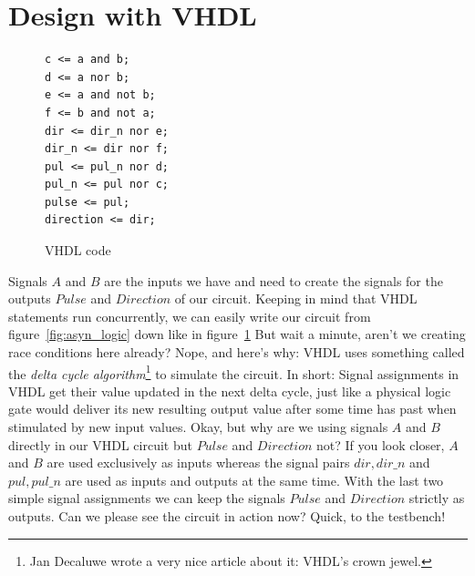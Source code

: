 \documentclass[a4paper]{article}
\begin{document}
\section{Design with VHDL}
\begin{figure}
\centering
\begin{BVerbatim}
c <= a and b;
d <= a nor b;
e <= a and not b;
f <= b and not a;
dir <= dir_n nor e;
dir_n <= dir nor f;
pul <= pul_n nor d;
pul_n <= pul nor c;
pulse <= pul;
direction <= dir;
\end{BVerbatim}
\caption{VHDL code}
\label{fig:asyn_vhdl}
\end{figure}
Signals $A$ and $B$ are the inputs we have and need to create the signals for the outputs $Pulse$ and $Direction$ of our circuit.
Keeping in mind that VHDL statements run concurrently, we can easily write our circuit from figure~\ref{fig:asyn_logic} down like in figure~\ref{fig:asyn_vhdl}
But wait a minute, aren't we creating race conditions here already?
Nope, and here's why: VHDL uses something called the \emph{delta cycle algorithm}\footnote{Jan Decaluwe wrote a very nice article about it: VHDL's crown jewel.} to simulate the circuit.
In short: Signal assignments in VHDL get their value updated in the next delta cycle, just like a physical logic gate would deliver its new resulting output value after some time has past when stimulated by new input values.
Okay, but why are we using signals $A$ and $B$ directly in our VHDL circuit but $Pulse$ and $Direction$ not?
If you look closer, $A$ and $B$ are used exclusively as inputs whereas the signal pairs $dir,dir\_n$ and $pul,pul\_n$ are used as inputs and outputs at the same time.
With the last two simple signal assignments we can keep the signals $Pulse$ and $Direction$ strictly as outputs.
Can we please see the circuit in action now? Quick, to the testbench!
\newpage
\end{document}
